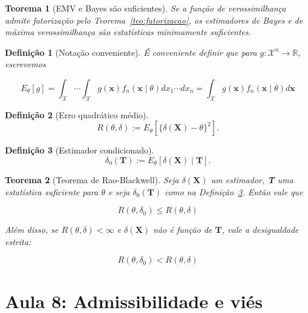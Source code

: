 \documentclass{article}
\newtheorem{theorem}{Teorema}
\newtheorem{definition}{Definição}
\begin{document}
\begin{theorem}[EMV e Bayes são suficientes]
Se a função de verossimilhança admite fatorização pelo Teorema~\ref{teo:fatorizacao}, os estimadores de Bayes e de máxima verossimilhança são estatísticas minimamente suficientes.
\end{theorem}

\begin{definition}[Notação conveniente]
É conveniente definir que para $g : \mathcal{X}^n \rightarrow \mathbb{R}$, escrevemos

\begin{equation}
    E_\theta [g] = \int_\mathcal{X} \cdots \int_\mathcal{X} g(\textbf{x}) f_n (\textbf{x} \mid \theta) d x_1 \cdots d x_n = \int_\mathcal{X} g(\textbf{x}) f_n (\textbf{x} \mid \theta) d \textbf{x} 
\end{equation}
\end{definition}

\begin{definition}[Erro quadrático médio]
\begin{equation}
    R(\theta, \delta) := E_\theta \left [ \{ \delta(\textbf{X}) - \theta \}^2 \right ].
\end{equation}
\end{definition}

\begin{definition}[Estimador condicionado]\label{def:est. cond.}
\begin{equation}
    \delta_0 (\textbf{T}) := E_\theta \left [ \delta(\textbf{X}) \mid \textbf{T} \right ].
\end{equation}
\end{definition}

\begin{theorem}[Teorema de Rao-Blackwell]
Seja $\delta(\textbf{X})$ um estimador, \textbf{T} uma estatística suficiente para $\theta$ e seja $\delta_0(\textbf{T})$ como na Definição~\ref{def:est. cond.}. Então vale que

$$R(\theta, \delta_0) \leq R(\theta, \delta)$$

Além disso, se $R(\theta, \delta) < \infty$ e $\delta (\textbf{X})$ não é função de $\textbf{T}$, vale a desigualdade estrita:

$$R(\theta, \delta_0) < R(\theta, \delta)$$
\end{theorem}

\section*{Aula 8: Admissibilidade e viés}
\end{document}

